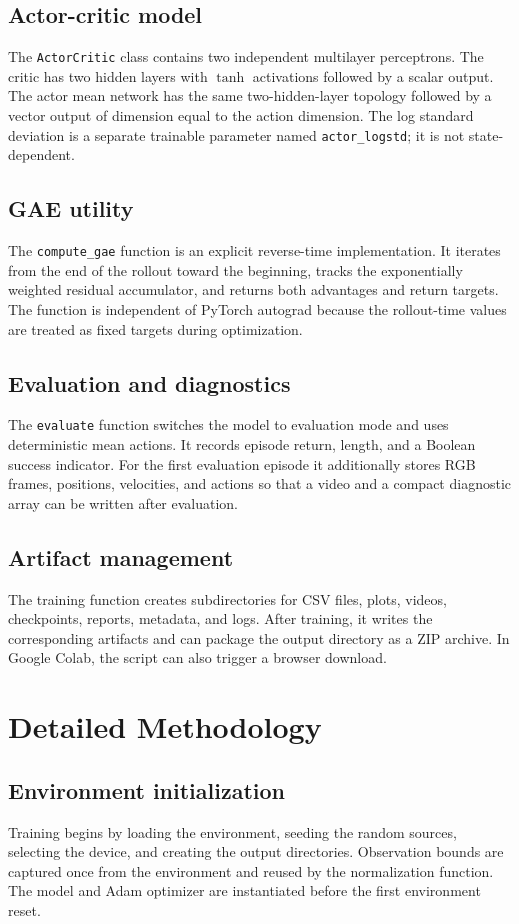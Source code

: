 \documentclass[11pt,a4paper]{article}
\begin{document}
\subsection{Actor-critic model}
The \texttt{ActorCritic} class contains two independent multilayer perceptrons. The critic has two hidden layers with $\tanh$ activations followed by a scalar output. The actor mean network has the same two-hidden-layer topology followed by a vector output of dimension equal to the action dimension. The log standard deviation is a separate trainable parameter named \texttt{actor\_logstd}; it is not state-dependent.

\subsection{GAE utility}
The \texttt{compute\_gae} function is an explicit reverse-time implementation. It iterates from the end of the rollout toward the beginning, tracks the exponentially weighted residual accumulator, and returns both advantages and return targets. The function is independent of PyTorch autograd because the rollout-time values are treated as fixed targets during optimization.

\subsection{Evaluation and diagnostics}
The \texttt{evaluate} function switches the model to evaluation mode and uses deterministic mean actions. It records episode return, length, and a Boolean success indicator. For the first evaluation episode it additionally stores RGB frames, positions, velocities, and actions so that a video and a compact diagnostic array can be written after evaluation.

\subsection{Artifact management}
The training function creates subdirectories for CSV files, plots, videos, checkpoints, reports, metadata, and logs. After training, it writes the corresponding artifacts and can package the output directory as a ZIP archive. In Google Colab, the script can also trigger a browser download.

\section{Detailed Methodology}
\subsection{Environment initialization}
Training begins by loading the environment, seeding the random sources, selecting the device, and creating the output directories. Observation bounds are captured once from the environment and reused by the normalization function. The model and Adam optimizer are instantiated before the first environment reset.
\end{document}

